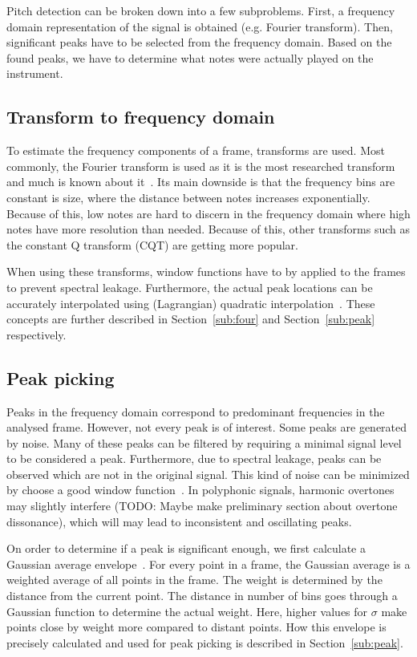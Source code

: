 \documentclass[10pt,twocolumn]{article}
\begin{document}
Pitch detection can be broken down into a few subproblems. First, a frequency domain representation of the signal is obtained (e.g. Fourier transform). Then, significant peaks have to be selected from the frequency domain. Based on the found peaks, we have to determine what notes were actually played on the instrument.

\subsection{Transform to frequency domain}
To estimate the frequency components of a frame, transforms are used. Most commonly, the Fourier transform is used as it is the most researched transform and much is known about it~\cite{survey2}. Its main downside is that the frequency bins are constant is size, where the distance between notes increases exponentially. Because of this, low notes are hard to discern in the frequency domain where high notes have more resolution than needed. Because of this, other transforms such as the constant Q transform (CQT) are getting more popular.

When using these transforms, window functions have to by applied to the frames to prevent spectral leakage. Furthermore, the actual peak locations can be accurately interpolated using (Lagrangian) quadratic interpolation~\cite{interpol}. These concepts are further described in Section~\ref{sub:four} and Section~\ref{sub:peak} respectively.

\subsection{Peak picking}
Peaks in the frequency domain correspond to predominant frequencies in the analysed frame. However, not every peak is of interest. Some peaks are generated by noise. Many of these peaks can be filtered by requiring a minimal signal level to be considered a peak. Furthermore, due to spectral leakage, peaks can be observed which are not in the original signal. This kind of noise can be minimized by choose a good window function~\cite{window}. In polyphonic signals, harmonic overtones may slightly interfere (TODO: Maybe make preliminary section about overtone dissonance), which will may lead to inconsistent and oscillating peaks.

On order to determine if a peak is significant enough, we first calculate a Gaussian average envelope~\cite{gauss}. For every point in a frame, the Gaussian average is a weighted average of all points in the frame. The weight is determined by the distance from the current point. The distance in number of bins goes through a Gaussian function to determine the actual weight. Here, higher values for $\sigma$ make points close by weight more compared to distant points. How this envelope is precisely calculated and used for peak picking is described in Section~\ref{sub:peak}.
\end{document}
